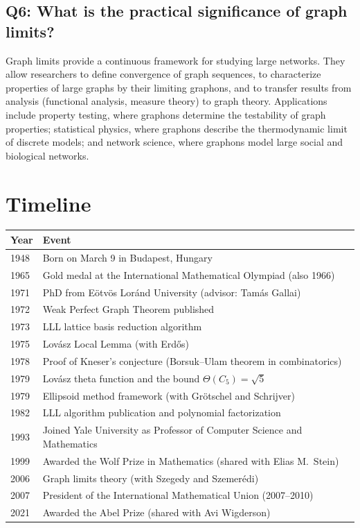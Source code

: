 \subsection*{Q6: What is the practical significance of graph limits?}

Graph limits provide a continuous framework for studying large networks. They allow researchers to define convergence of graph sequences, to characterize properties of large graphs by their limiting graphons, and to transfer results from analysis (functional analysis, measure theory) to graph theory. Applications include property testing, where graphons determine the testability of graph properties; statistical physics, where graphons describe the thermodynamic limit of discrete models; and network science, where graphons model large social and biological networks.

\section*{Timeline}
\begin{tabularx}{\linewidth}{|p{1.5cm}|>{\raggedright\arraybackslash}X|}
\hline
\textbf{Year} & \textbf{Event} \\ \hline
1948 & Born on March 9 in Budapest, Hungary \\ \hline
1965 & Gold medal at the International Mathematical Olympiad (also 1966) \\ \hline
1971 & PhD from E\"{o}tv\"{o}s Lor\'{a}nd University (advisor: Tam\'{a}s Gallai) \\ \hline
1972 & Weak Perfect Graph Theorem published \\ \hline
1973 & LLL lattice basis reduction algorithm \\ \hline
1975 & Lov\'{a}sz Local Lemma (with Erd\H{o}s) \\ \hline
1978 & Proof of Kneser's conjecture (Borsuk--Ulam theorem in combinatorics) \\ \hline
1979 & Lov\'{a}sz theta function and the bound \(\Theta(C_5) = \sqrt{5}\) \\ \hline
1979 & Ellipsoid method framework (with Gr\"{o}tschel and Schrijver) \\ \hline
1982 & LLL algorithm publication and polynomial factorization \\ \hline
1993 & Joined Yale University as Professor of Computer Science and Mathematics \\ \hline
1999 & Awarded the Wolf Prize in Mathematics (shared with Elias M.\ Stein) \\ \hline
2006 & Graph limits theory (with Szegedy and Szemer\'{e}di) \\ \hline
2007 & President of the International Mathematical Union (2007--2010) \\ \hline
2021 & Awarded the Abel Prize (shared with Avi Wigderson) \\ \hline
\end{tabularx}

